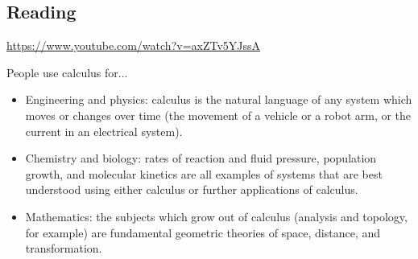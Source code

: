 



\subsection*{Reading}
\begin{center}
\begin{tcolorbox}[width=0.8\textwidth,colback={white},title={\textbf{Go and watch...}},colbacktitle=black,coltitle=white]
  \textcolor{black}{\url{https://www.youtube.com/watch?v=axZTv5YJssA}}
\end{tcolorbox}
\end{center}

\begin{center}
\begin{tcolorbox}[width=0.8\textwidth,colback={white},title={\textbf{What's it good for?}},colbacktitle=MidnightBlue,coltitle=white]
  People use calculus for...
  \begin{itemize}
    \item Engineering and physics: calculus is the natural language of any system which moves or changes over time (the movement of
          a vehicle or a robot arm, or the current in an electrical system).
    \item Chemistry and biology: rates of reaction and fluid pressure, population growth, and molecular kinetics are all examples of
          systems that are best understood using either calculus or further applications of calculus.
    \item Mathematics: the subjects which grow out of calculus (analysis and topology, for example) are fundamental geometric theories
          of space, distance, and transformation.
  \end{itemize}
\end{tcolorbox}
\end{center}

